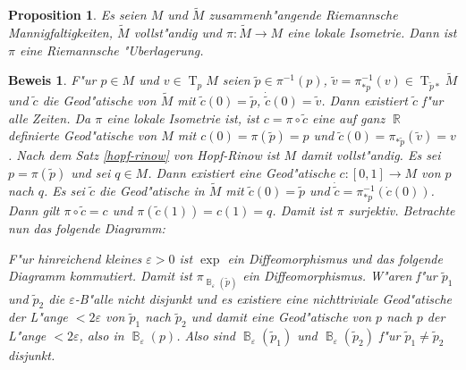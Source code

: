 \documentclass[paper=A4, twoside, chapterprefix=true, bibliography=totoc, headsepline]{scrbook}
\let\temp\phi
\let\phi\varphi
\let\varphi\temp
\let\temp\theta
\let\theta\vartheta
\let\vartheta\temp
\let\temp\epsilon
\let\epsilon\varepsilon
\let\varepsilon\temp
\let\temp\rho
\let\rho\varrho
\let\varrho\temp
\DeclareMathOperator{\R}{\mathbb{R}}
\DeclareMathOperator{\B}{\mathbb{B}} %
\DeclareMathOperator{\T}{T} %
\theoremstyle{plain}
\newtheorem{Prop}[Dfn]{Proposition}
\theoremstyle{nonumberplain}
\newtheorem{bew}{Beweis}
\theoremstyle{empty}
\theoremstyle{break}
\begin{document}
\begin{Prop}\label{prop-9-12}
  Es seien $M$ und $\tilde M$ zusammenh"angende Riemannsche Mannigfaltigkeiten, $\tilde M$ vollst"andig und $\pi: \tilde M \to M$ eine lokale Isometrie. Dann ist $\pi$ eine Riemannsche "Uberlagerung.
\end{Prop}

\begin{bew}
  F"ur $p \in M$ und $v \in \T_pM$ seien $\tilde p \in \pi^{-1}(p)$, $\tilde v = \pi_{*p}^{-1}(v) \in \T_{\tilde p *}\tilde M$ und $\tilde c$ die Geod"atische von $\tilde M$ mit $\tilde c(0) = \tilde p$, $\dot{\tilde{c}}(0) = \tilde v$.
  Dann existiert $\tilde c$ f"ur alle Zeiten. Da $\pi$ eine lokale Isometrie ist, ist $c = \pi \circ \tilde c$ eine auf ganz $\R$ definierte Geod"atische von $M$ mit $c(0) = \pi(\tilde p) = p$ und $\tilde c(0) = \pi_{* \tilde p}(\tilde v) = v$.
  Nach dem Satz \ref{hopf-rinow} von Hopf-Rinow ist $M$ damit vollst"andig. Es sei $p = \pi(\tilde p)$ und sei $q \in M$.
  Dann existiert eine Geod"atische $c: [0,1] \to M$ von $p$ nach $q$. Es sei $\tilde c$ die Geod"atische in $\tilde M$ mit $\tilde c(0) = \tilde p$ und $\dot{\tilde{c}} = \pi_{*p}^{-1}(\dot c(0))$.
  Dann gilt $\pi \circ \tilde c = c$ und $\pi(\tilde c(1)) = c(1) = q$.
  Damit ist $\pi$ surjektiv. Betrachte nun das folgende Diagramm:
  \begin{center}\end{center}
  F"ur hinreichend kleines $\epsilon > 0$ ist $\exp$ ein Diffeomorphismus und das folgende Diagramm kommutiert.
  Damit ist $\pi_{\B_\epsilon(\tilde p)}$ ein Diffeomorphismus.
  W"aren f"ur $\tilde p_1$ und $\tilde p_2$ die $\epsilon$-B"alle nicht disjunkt und es existiere eine nichttriviale Geod"atische der L"ange $< 2 \epsilon$ von $\tilde p_1$ nach $\tilde p_2$ und damit eine Geod"atische von $p$ nach $p$ der L"ange $< 2 \epsilon$, also in $\B_\epsilon(p)$.
  Also sind $\B_\epsilon(\tilde p_1)$ und $\B_\epsilon(\tilde p_2)$ f"ur $\tilde p_1 \ne \tilde p_2$ disjunkt.
\end{bew}
\end{document}

